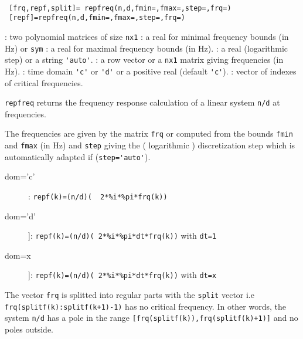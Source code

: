 \begin{mandesc}
   \\ %
\end{mandesc}
\begin{calling_sequence}
\begin{verbatim}
 [frq,repf,split]= repfreq(n,d,fmin=,fmax=,step=,frq=)   
 [repf]=repfreq(n,d,fmin=,fmax=,step=,frq=)  
\end{verbatim}
\end{calling_sequence}
\begin{parameters}
  \begin{varlist}
    : two polynomial matrices of size \verb!nx1!
    : a real for minimal frequency bounds (in Hz) or \verb!sym!
    : a real for maximal frequency bounds (in Hz).
    : a real (logarithmic step) or a string \verb!'auto'!.
    : a row vector or a \verb!nx1! matrix giving frequencies (in Hz).
    : time domain \verb!'c'! or \verb!'d'! or a positive real (default \verb!'c'!).
    : vector of indexes of critical frequencies.
  \end{varlist}
\end{parameters}
\begin{mandescription}
  \verb!repfreq! returns the frequency response calculation of a linear system \verb!n/d! at frequencies. 

  The frequencies are given by the matrix \verb!frq! or computed from
  the bounds \verb!fmin! and \verb!fmax! (in Hz) and \verb!step! giving
  the ( logarithmic ) discretization step which is automatically adapted if
  (\verb!step='auto'!).
    
  \begin{description}
  \item[dom='c']: \verb!repf(k)=(n/d)(  2*%i*%pi*frq(k))! 
  \item[dom='d']]: \verb!repf(k)=(n/d)( 2*%i*%pi*dt*frq(k))! with \verb!dt=1! 
  \item[dom=x]]: \verb!repf(k)=(n/d)( 2*%i*%pi*dt*frq(k))! with \verb!dt=x! 
  \end{description}

  The vector \verb!frq! is splitted into regular parts with the \verb!split! vector i.e 
  \verb!frq(splitf(k):splitf(k+1)-1)! has no critical frequency. In other words, 
  the system \verb!n/d! has a pole in the range \verb![frq(splitf(k)),frq(splitf(k)+1)]! and 
  no poles outside.
\end{mandescription}
